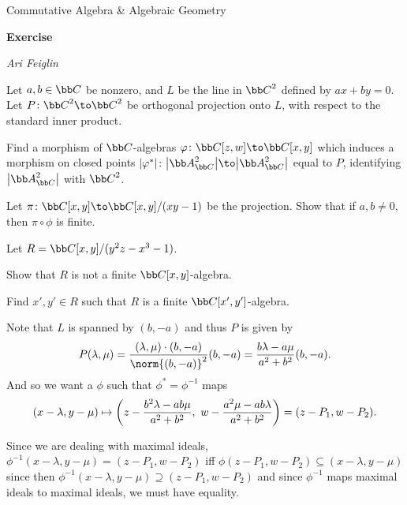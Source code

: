 


\def\enumindent{0cm}

\def\printmcount{\the\counter{section}.\the\counter{math counter}}
\setcounter{section}{5}

\centerline{Commutative Algebra \& Algebraic Geometry}
\medskip
\centerline{\bf Exercise \the{}}
\smallskip
\centerline{\it Ari Feiglin}

\bprob

    \benum
        \item Let $a,b\in\bC$ be nonzero, and $L$ be the line in $\bC^2$ defined by $ax+by=0$.
        Let $P\colon\bC^2\to\bC^2$ be orthogonal projection onto $L$, with respect to the standard inner product.
        \benum
            \item Find a morphism of $\bC$-algebras $\phi\colon\bC[z,w]\to\bC[x,y]$ which induces a morphism on closed points
            $\abs{\phi^*}\colon\abs{\bA^2_\bC}\to\abs{\bA^2_\bC}$ equal to $P$, identifying $\abs{\bA^2_\bC}$ with $\bC^2$.
            \item Let $\pi\colon\bC[x,y]\to\bC[x,y]/(xy-1)$ be the projection.
            Show that if $a,b\neq0$, then $\pi\circ\phi$ is finite.
        \eenum
        \item Let $R=\bC[x,y]/(y^2z-x^3-1)$.
        \benum
            \item Show that $R$ is not a finite $\bC[x,y]$-algebra.
            \item Find $x',y'\in R$ such that $R$ is a finite $\bC[x',y']$-algebra.
        \eenum
    \eenum

\eprob

\benum
    \item
    \benum
        \item Note that $L$ is spanned by $(b,-a)$ and thus $P$ is given by
        $$ P(\lambda,\mu) = \frac{(\lambda,\mu)\cdot(b,-a)}{\norm{(b,-a)}^2}(b,-a) = \frac{b\lambda-a\mu}{a^2+b^2}(b,-a) . $$
        And so we want a $\phi$ such that $\phi^*=\phi^{-1}$ maps
        $$ (x-\lambda,y-\mu) \mapsto \mathopen{}\mathclose{\left(z - {{b^2\lambda-ab\mu}\over{a^2+b^2}},\ w - {{a^2\mu - ab\lambda}\over{a^2+b^2}}\right)} = (z-P_1,w-P_2) . $$

        Since we are dealing with maximal ideals, $\phi^{-1}(x-\lambda,y-\mu)=(z-P_1,w-P_2)$ iff $\phi(z-P_1,w-P_2)\subseteq(x-\lambda,y-\mu)$
        since then $\phi^{-1}(x-\lambda,y-\mu)\supseteq(z-P_1,w-P_2)$ and since $\phi^{-1}$ maps maximal ideals to maximal ideals, we must have equality.

